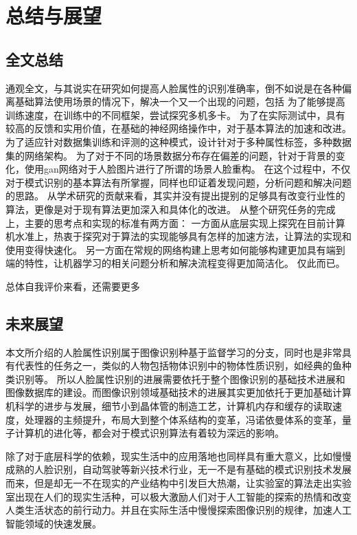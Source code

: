 \chapter{总结与展望}
\section{全文总结}
通观全文，与其说实在研究如何提高人脸属性的识别准确率，倒不如说是在各种偏离基础算法使用场景的情况下，解决一个又一个出现的问题，包括
为了能够提高训练速度，在训练中的不同框架，尝试探究多机多卡。
为了在实际测试中，具有较高的反馈和实用价值，在基础的神经网络操作中，对于基本算法的加速和改进。
为了适应针对数据集训练和评测的这种模式，设计针对于多种属性标签，多种数据集的网络架构。
为了对于不同的场景数据分布存在偏差的问题，针对于背景的变化，使用gan网络对于人脸图片进行了所谓的场景人脸重构。
在这个过程中，不仅对于模式识别的基本算法有所掌握，同样也印证着发现问题，分析问题和解决问题的思路。
从学术研究的贡献来看，其实并没有提出提别的足够具有改变行业性的算法，更像是对于现有算法更加深入和具体化的改进。
从整个研究任务的完成上，主要的思考点和实现的标准有两方面：
一方面从底层实现上探究在目前计算机水准上，热衷于探究对于算法的实现能够具有怎样的加速方法，让算法的实现和使用变得快速化。
另一方面在常规的网络构建上思考如何能够构建更加具有端到端的特性，让机器学习的相关问题分析和解决流程变得更加简洁化。
仅此而已。

总体自我评价来看，还需要更多

\section{未来展望}
本文所介绍的人脸属性识别属于图像识别种基于监督学习的分支，同时也是非常具有代表性的任务之一，类似的人物包括物体识别中的物体性质识别，如经典的鱼种类识别等。
所以人脸属性识别的进展需要依托于整个图像识别的基础技术进展和图像数据库的建设。而图像识别领域基础技术的进展其实更加依托于更加基础计算机科学的进步与发展，细节小到晶体管的制造工艺，计算机内存和缓存的读取速度，处理器的主频提升，布局大到整个体系结构的变革，冯诺依曼体系的变革，量子计算机的进化等，都会对于模式识别算法有着较为深远的影响。

除了对于底层科学的依赖，现实生活中的应用落地也同样具有重大意义，比如慢慢成熟的人脸识别，自动驾驶等新兴技术行业，无一不是有基础的模式识别技术发展而来，但是却无一不在现实的产业结构中引发巨大热潮，让实验室的算法走出实验室出现在人们的现实生活种，可以极大激励人们对于人工智能的探索的热情和改变人类生活状态的前行动力。并且在实际生活中慢慢探索图像识别的规律，加速人工智能领域的快速发展。



 
